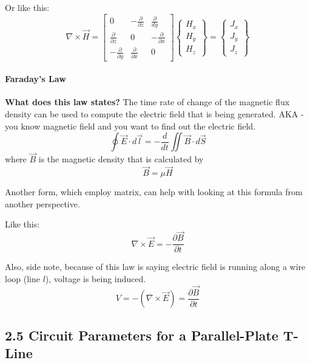 \documentclass[11pt]{article}
\begin{document}
Or like this: \[
\nabla \times \vec{H} = \begin{bmatrix}
                            0 & -\frac{\partial}{\partial z} & \frac{\partial}{dy} \\
                            \frac{\partial}{\partial z} & 0 & -\frac{\partial}{\partial x} \\
                            -\frac{\partial}{\partial y} & \frac{\partial}{\partial x} & 0
                        \end{bmatrix}
                        \begin{Bmatrix}
                            H_x \\ H_y \\ H_z
                        \end{Bmatrix}
                        =
                        \begin{Bmatrix}
                            J_x \\ J_y \\ J_z
                        \end{Bmatrix}
\]

    \hypertarget{faradays-law}{%
\paragraph{Faraday's Law}\label{faradays-law}}

\textbf{What does this law states?} The time rate of change of the
magnetic flux density can be used to compute the electric field that is
being generated. AKA - you know magnetic field and you want to find out
the electric field.
\[\oint{\vec{E}\cdot d\vec{l}}=-\frac{d}{dt}\iint{\vec{B}\cdot d\vec{S}}\]
where \(\vec{B}\) is the magnetic density that is calculated by
\[\vec{B}=\mu \vec{H}\]

    Another form, which employ matrix, can help with looking at this formula
from another perspective.

Like this:
\[\nabla \times \vec{E} = -\frac{\partial \vec{B}}{\partial t}\]

    Also, side note, because of this law is saying electric field is running
along a wire loop (line \(l\)), voltage is being
induced.\[V=-(\nabla \times \vec{E})=\frac{\partial \vec{B}}{\partial t}\]

    \hypertarget{circuit-parameters-for-a-parallel-plate-t-line}{%
\subsection{2.5 Circuit Parameters for a Parallel-Plate
T-Line}\label{circuit-parameters-for-a-parallel-plate-t-line}}
\end{document}

